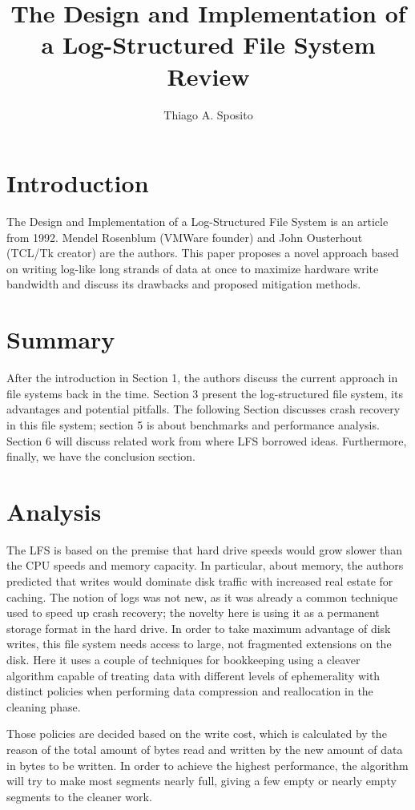 \documentclass[12pt]{article}
\title{The Design and Implementation of a Log-Structured File System Review}
\author{Thiago A. Sposito\inst{1} }
\begin{document}
 

\maketitle


\section{Introduction}
The Design and Implementation of a Log-Structured File
System is an article from 1992. Mendel Rosenblum (VMWare founder) and John Ousterhout (TCL/Tk creator) are the authors. This paper proposes a novel approach based on writing log-like long strands of data at once to maximize hardware write bandwidth and discuss its drawbacks and proposed mitigation methods.

\section{Summary} 
After the introduction in Section 1, the authors discuss the current approach in file systems back in the time. Section 3 present the log-structured file system, its advantages and potential pitfalls. The following Section discusses crash recovery in this file system; section 5 is about benchmarks and performance analysis. Section 6 will discuss related work from where LFS borrowed ideas. Furthermore, finally, we have the conclusion section.


\section{Analysis}
The LFS is based on the premise that hard drive speeds would grow slower than the CPU speeds and memory capacity\cite{walter2005kryder}. In particular, about memory, the authors predicted that writes would dominate disk traffic with increased real estate for caching. The notion of logs was not new, as it was already a common technique used to speed up crash recovery; the novelty here is using it as a permanent storage format in the hard drive.
In order to take maximum advantage of disk writes, this file system needs access to large, not fragmented extensions on the disk. Here it uses a couple of techniques for bookkeeping using a cleaver algorithm capable of treating data with different levels of ephemerality with distinct policies when performing data compression and reallocation in the cleaning phase.

Those policies are decided based on the write cost, which is calculated by the reason of the total amount of bytes read and written by the new amount of data in bytes to be written. In order to achieve the highest performance, the algorithm will try to make most segments nearly full, giving a few empty or nearly empty segments to the cleaner work.
\end{document}
